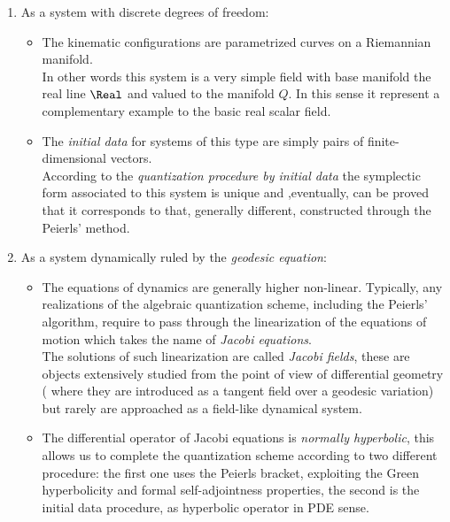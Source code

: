 \documentclass[Main]{subfiles}
\begin{document}
\begin{enumerate}
	\item As a system with discrete degrees of freedom:
	\begin{itemize}
		\item The kinematic configurations are parametrized curves on a Riemannian manifold.\\
				In other words this system is a very simple field with base manifold the real line $\Real$ and valued to the manifold $Q$. 
				In this sense it represent a complementary example to the basic real scalar field.

		\item The \emph{initial data} for systems of this type are simply pairs of finite-dimensional vectors.\\
			According to the \emph{quantization procedure by initial data} the symplectic form associated to this system is unique and ,eventually, can be proved that it corresponds to that, generally different, constructed through the Peierls' method.


	\end{itemize}

	\item As a system dynamically ruled by the \emph{geodesic equation}:
	\begin{itemize}
		\item The equations of dynamics are generally higher non-linear. 
		Typically, any realizations of the algebraic quantization scheme, including the Peierls' algorithm, require to pass through the linearization of the equations of motion which takes the name of \emph{Jacobi equations}.
			\\
			The solutions of such linearization are called \emph{Jacobi fields},
			these are objects extensively studied from the point of view of differential geometry 
			( where they are introduced as a tangent field over a geodesic variation) but rarely are approached as a field-like dynamical system.
		\item The differential operator of Jacobi equations is \emph{normally hyperbolic}, this allows us to complete the quantization scheme according to two different procedure: 
		the first one uses the Peierls bracket, exploiting the Green hyperbolicity and formal self-adjointness properties, 
		the second is the initial data procedure, as hyperbolic operator in PDE sense.
	\end{itemize}
\end{enumerate}
\end{document}
